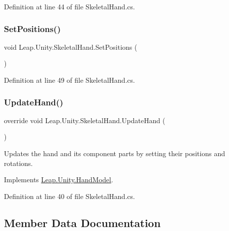 Definition at line 44 of file Skeletal\+Hand.\+cs.

\mbox{\label{class_leap_1_1_unity_1_1_skeletal_hand_a65cd240a6967b624cf928043a07c257d}} 
\subsubsection{\texorpdfstring{SetPositions()}{SetPositions()}}
{\footnotesize\ttfamily void Leap.\+Unity.\+Skeletal\+Hand.\+Set\+Positions (\begin{DoxyParamCaption}{ }\end{DoxyParamCaption})\hspace{0.3cm}{\ttfamily [protected]}}



Definition at line 49 of file Skeletal\+Hand.\+cs.

\mbox{\label{class_leap_1_1_unity_1_1_skeletal_hand_afe381218670f759392ccbb420dae78f4}} 
\subsubsection{\texorpdfstring{UpdateHand()}{UpdateHand()}}
{\footnotesize\ttfamily override void Leap.\+Unity.\+Skeletal\+Hand.\+Update\+Hand (\begin{DoxyParamCaption}{ }\end{DoxyParamCaption})\hspace{0.3cm}{\ttfamily [virtual]}}

Updates the hand and its component parts by setting their positions and rotations. 

Implements \mbox{\hyperlink{class_leap_1_1_unity_1_1_hand_model_acbb96fd18f28d01a74c1e0ac709b1977}{Leap.\+Unity.\+Hand\+Model}}.



Definition at line 40 of file Skeletal\+Hand.\+cs.



\subsection{Member Data Documentation}
\mbox{\label{class_leap_1_1_unity_1_1_skeletal_hand_a6fd0e37776aa6c1f28c0db3c63de6d10}} 
